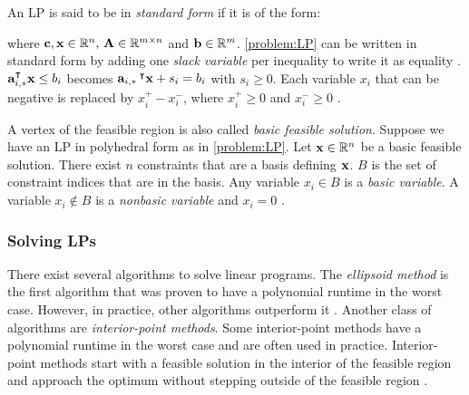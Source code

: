 An LP is said to be in \textit{standard form} if it is of the form:

\quad where $\bold c, \bold x \in \mathbb{R}^n, \, \bold A \in \mathbb{R}^{m \times n}$ and $\bold b \in \mathbb{R}^m$. 
\cref{problem:LP} can be written in standard form by adding one \textit{slack variable} per inequality to write it as equality \cite{noauthor_numerical_2006}. $\bold a_{i,*}^\intercal \bold x \leq b_i$ becomes $\bold a_{i,*} \,^\intercal \bold x + s_i = b_i$ with $s_i \geq 0$. Each variable $x_i$ that can be negative is replaced by $x_i^+ - x_i^-$, where $x_i^+ \geq 0$ and $x_i^- \geq 0$ \cite{noauthor_numerical_2006}.

A vertex of the feasible region is also called \textit{basic feasible solution}. Suppose we have an LP in polyhedral form as in \cref{problem:LP}. Let $\bold x \in \mathbb{R}^n$ be a basic feasible solution. There exist $n$ constraints that are a basis defining $\bold x$. $B$ is the set of constraint indices that are in the basis. Any variable $x_i \in B$ is a \textit{basic variable}. A variable $x_i \not \in B$ is a \textit{nonbasic variable} and $x_i=0$ \cite{understanding_lp}.

\subsubsection{Solving LPs}
There exist several algorithms to solve linear programs. The \textit{ellipsoid method} is the first algorithm that was proven to have a polynomial runtime in the worst case. However, in practice, other algorithms outperform it \cite{understanding_lp}. Another class of algorithms are \textit{interior-point methods}. Some interior-point methods have a polynomial runtime in the worst case and are often used in practice. Interior-point methods start with a feasible solution in the interior of the feasible region and approach the optimum without stepping outside of the feasible region \cite{understanding_lp}. 

